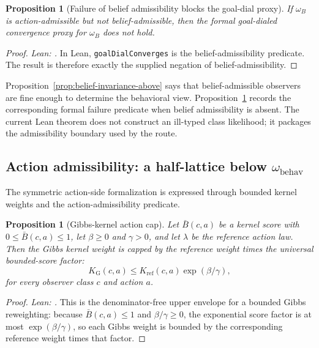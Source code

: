 \documentclass[11pt]{article}
\newtheorem{proposition}[theorem]{Proposition}
\theoremstyle{definition}
\theoremstyle{remark}
\theoremstyle{plain}
\theoremstyle{definition}
\begin{document}
\begin{proposition}[Failure of belief admissibility blocks the goal-dial proxy]
\label{prop:belief-illtyped-below}
If $\omega_B$ is action-admissible but not belief-admissible, then the formal goal-dialed convergence proxy for $\omega_B$ does not hold.
\end{proposition}

\begin{proof}
\noindent\emph{Lean: .}
In Lean, \texttt{goalDialConverges} is the belief-admissibility predicate. The result is therefore exactly the supplied negation of belief-admissibility.
\end{proof}

Proposition~\ref{prop:belief-invariance-above} says that belief-admissible observers are fine enough to determine the behavioral view. Proposition~\ref{prop:belief-illtyped-below} records the corresponding formal failure predicate when belief admissibility is absent. The current Lean theorem does not construct an ill-typed class likelihood; it packages the admissibility boundary used by the route.

\subsection{Action admissibility: a half-lattice below $\omega_{\mathrm{behav}}$}
\label{sec:action-admissibility}

The symmetric action-side formalization is expressed through bounded kernel weights and the action-admissibility predicate.

\begin{proposition}[Gibbs-kernel action cap]
\label{prop:action-cap}
Let $\bar B(c,a)$ be a kernel score with $0\le \bar B(c,a)\le1$, let $\beta\ge0$ and $\gamma>0$, and let $\lambda$ be the reference action law. Then the Gibbs kernel weight is capped by the reference weight times the universal bounded-score factor:
\[
K_{\mathrm G}(c,a)
\le
K_{\mathrm{ref}}(c,a)\exp(\beta/\gamma),
\]
for every observer class $c$ and action $a$.
\end{proposition}

\begin{proof}
\noindent\emph{Lean: .}
This is the denominator-free upper envelope for a bounded Gibbs reweighting: because $\bar B(c,a)\le1$ and $\beta/\gamma\ge0$, the exponential score factor is at most $\exp(\beta/\gamma)$, so each Gibbs weight is bounded by the corresponding reference weight times that factor.
\end{proof}
\end{document}
